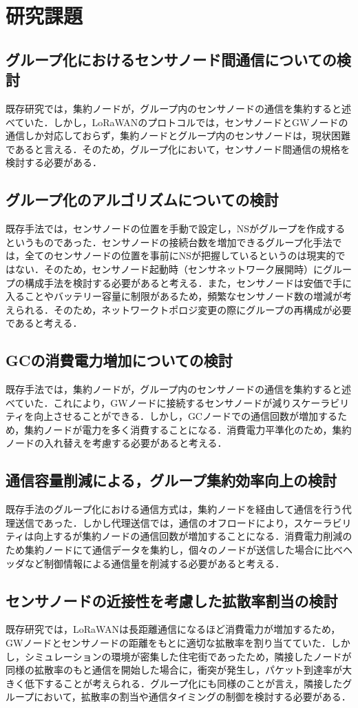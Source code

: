 \chapter{研究課題}

\section{グループ化におけるセンサノード間通信についての検討}
既存研究\cite{Obana2018}では，集約ノードが，グループ内のセンサノードの通信を集約すると述べていた．しかし，LoRaWANのプロトコルでは，センサノードとGWノードの通信しか対応しておらず，集約ノードとグループ内のセンサノードは，現状困難であると言える．そのため，グループ化において，センサノード間通信の規格を検討する必要がある．

\section{グループ化のアルゴリズムについての検討}
既存手法\cite{Obana2018}では，センサノードの位置を手動で設定し，NSがグループを作成するというものであった．センサノードの接続台数を増加できるグループ化手法では，全てのセンサノードの位置を事前にNSが把握しているというのは現実的ではない．そのため，センサノード起動時（センサネットワーク展開時）にグループの構成手法を検討する必要があると考える．また，センサノードは安価で手に入ることやバッテリー容量に制限があるため，頻繁なセンサノード数の増減が考えられる．そのため，ネットワークトポロジ変更の際にグループの再構成が必要であると考える．

\section{GCの消費電力増加についての検討}
既存手法\cite{Obana2018}では，集約ノードが，グループ内のセンサノードの通信を集約すると述べていた．これにより，GWノードに接続するセンサノードが減りスケーラビリティを向上させることができる．しかし，GCノードでの通信回数が増加するため，集約ノードが電力を多く消費することになる．消費電力平準化のため，集約ノードの入れ替えを考慮する必要があると考える．

\section{通信容量削減による，グループ集約効率向上の検討}
既存手法\cite{Obana2018}のグループ化における通信方式は，集約ノードを経由して通信を行う代理送信であった．しかし代理送信では，通信のオフロードにより，スケーラビリティは向上するが集約ノードの通信回数が増加することになる．消費電力削減のため集約ノードにて通信データを集約し，個々のノードが送信した場合に比べヘッダなど制御情報による通信量を削減する必要があると考える．

\section{センサノードの近接性を考慮した拡散率割当の検討}
既存研究\cite{2017}では，LoRaWANは長距離通信になるほど消費電力が増加するため，GWノードとセンサノードの距離をもとに適切な拡散率を割り当てていた．しかし，シミュレーションの環境が密集した住宅街であったため，隣接したノードが同様の拡散率のもと通信を開始した場合に，衝突が発生し，パケット到達率が大きく低下することが考えられる．グループ化にも同様のことが言え，隣接したグループにおいて，拡散率の割当や通信タイミングの制御を検討する必要がある．